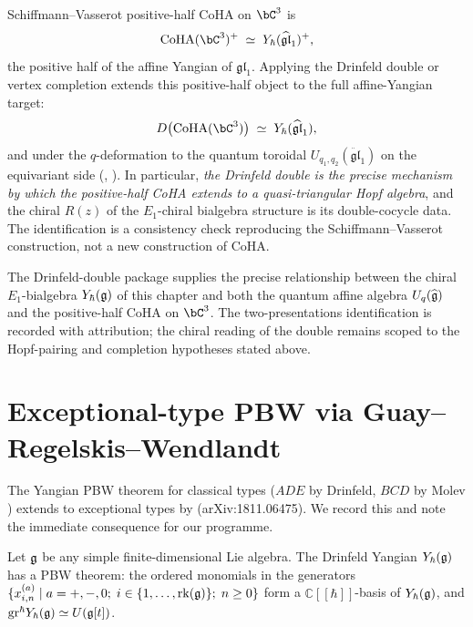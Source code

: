 \begin{remark}
\begin{enumerate}
Schiffmann--Vasserot positive-half CoHA on $\bC^3$ is
\cite{SchiffmannVasserot13}
\[
 \mathrm{CoHA}(\bC^{3})^{+} \;\simeq\;
 Y_\hbar(\widehat{\mathfrak{gl}}_1)^{+},
\]
the positive half of the affine Yangian of $\mathfrak{gl}_1$.
Applying the Drinfeld double or vertex completion extends this
positive-half object to the full affine-Yangian target:
\[
 D\bigl(\mathrm{CoHA}(\bC^{3})\bigr)
 \;\simeq\; Y_\hbar(\widehat{\mathfrak{gl}}_1),
\]
and under the $q$-deformation to the quantum toroidal
$U_{q_1,q_2}(\ddot{\mathfrak{gl}}_1)$ on the equivariant side
(\cite{FeiginJimboMiwaMukhin11}, \cite{SchiffmannVasserot13}). In
particular, \emph{the Drinfeld double is the precise mechanism by which
the positive-half CoHA extends to a quasi-triangular Hopf algebra}, and
the chiral $R(z)$ of the $E_1$-chiral bialgebra structure is its
double-cocycle data. The identification is a consistency check
reproducing the Schiffmann--Vasserot construction, not a new
construction of CoHA.
\end{enumerate}
The Drinfeld-double package supplies the precise relationship between
the chiral $E_1$-bialgebra
$Y_{\hbar}(\mathfrak{g})$ of this chapter and both the quantum affine algebra
$U_q(\widehat{\mathfrak{g}})$ and the positive-half CoHA on $\bC^{3}$.
The two-presentations identification is recorded with attribution; the
chiral reading of the double remains scoped to the Hopf-pairing and
completion hypotheses stated above.
\end{remark}

\section{Exceptional-type PBW via Guay--Regelskis--Wendlandt}
\label{sec:exceptional-PBW}

The Yangian PBW theorem for classical types
($ADE$ by Drinfeld, $BCD$ by Molev \cite{Molev07}) extends to
exceptional types by \cite{GuayRegelskisWendlandt18}
(arXiv:1811.06475). We record this and note the immediate consequence
for our programme.

\begin{theorem}
\label{thm:exceptional-PBW}
\ClaimStatusProvedElsewhere
Let $\mathfrak{g}$ be any simple finite-dimensional Lie algebra. The Drinfeld
Yangian $Y_{\hbar}(\mathfrak{g})$ has a PBW theorem: the ordered monomials in the
generators $\{x^{(a)}_{i,n}\mid a = +, -, 0;\; i\in \{1, \ldots,
\mathrm{rk}(\mathfrak{g})\};\; n\ge 0\}$ form a $\mathbb{C}[\![\hbar]\!]$-basis
of $Y_{\hbar}(\mathfrak{g})$, and
$\mathrm{gr}^{\hbar}Y_{\hbar}(\mathfrak{g}) \simeq U(\mathfrak{g}[t])$.
\end{theorem}

